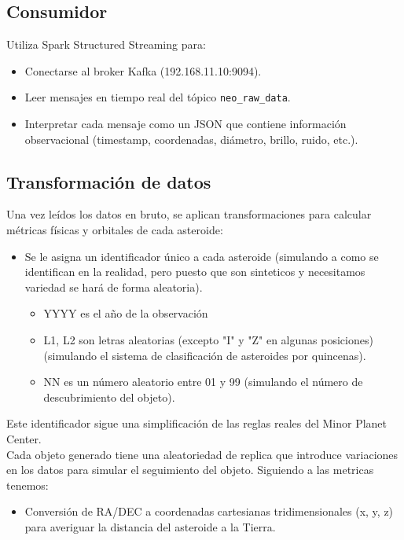 \documentclass[12pt]{article}
\begin{document}
\subsection{Consumidor}
Utiliza Spark Structured Streaming para:

\begin{itemize}
  \item Conectarse al broker Kafka (192.168.11.10:9094).
  \item Leer mensajes en tiempo real del tópico \texttt{neo\_raw\_data}.
  \item Interpretar cada mensaje como un JSON que contiene información observacional 
        (timestamp, coordenadas, diámetro, brillo, ruido, etc.).
\end{itemize}

\subsection{Transformación de datos}
Una vez leídos los datos en bruto, se aplican transformaciones para calcular métricas físicas y orbitales de cada asteroide:
\\
\begin{itemize}
  \item Se le asigna un identificador único a cada asteroide (simulando a como se identifican en la realidad, pero puesto que son sinteticos
  y necesitamos variedad se hará de forma aleatoria).
  \begin{itemize}
    \item YYYY es el año de la observación
    \item L1, L2 son letras aleatorias (excepto "I" y "Z" en algunas posiciones)(simulando el sistema de clasificación de asteroides por quincenas).
    \item NN es un número aleatorio entre 01 y 99 (simulando el número de descubrimiento del objeto).
  \end{itemize}
\end{itemize}
Este identificador sigue una simplificación de las reglas reales del Minor Planet Center.
\\
Cada objeto generado tiene una aleatoriedad de replica que introduce variaciones en los datos para simular el seguimiento del objeto.
Siguiendo a las metricas tenemos:
\\
\begin{itemize}
  \item Conversión de RA/DEC a coordenadas cartesianas tridimensionales (x, y, z) para averiguar la distancia del asteroide a la Tierra.
\end{itemize}
\end{document}
